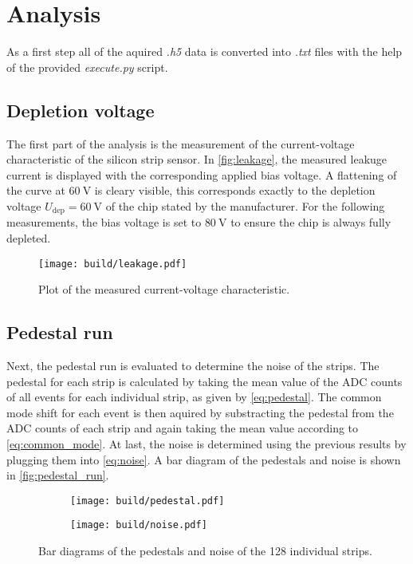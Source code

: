 \section{Analysis}
\label{sec:Analysis}

As a first step all of the aquired \textit{.h5} data is converted into \textit{.txt} files with
the help of the provided \textit{execute.py} script.

\subsection{Depletion voltage}

The first part of the analysis is the measurement of the current-voltage characteristic of the
silicon strip sensor. In \autoref{fig:leakage}, the measured leakuge current is displayed with
the corresponding applied bias voltage. A flattening of the curve at $\qty{60}{\volt}$ is cleary
visible, this corresponds exactly to the depletion voltage $U_{\text{dep}}=\qty{60}{\volt}$ of
the chip stated by the manufacturer. For the following measurements, the bias voltage is
set to $\qty{80}{\volt}$ to ensure the chip is always fully depleted.

\begin{figure}[H]
  \centering
  \texttt{[image: build/leakage.pdf]}
  \caption{Plot of the measured current-voltage characteristic.}
  \label{fig:leakage}
\end{figure}

\subsection{Pedestal run}

Next, the pedestal run is evaluated to determine the noise of the strips. The pedestal
for each strip is calculated by taking the mean value of the ADC counts of all events for each individual strip,
as given by \eqref{eq:pedestal}. The common mode shift for each event is then aquired by substracting
the pedestal from the ADC counts of each strip and again taking the mean value according to
\eqref{eq:common_mode}. At last, the noise is determined using the previous results by
plugging them into \eqref{eq:noise}. A bar diagram of the pedestals and noise is shown in
\autoref{fig:pedestal_run}.

\begin{figure}[H]
  \centering
    \begin{subfigure}{0.45\textwidth}
      \texttt{[image: build/pedestal.pdf]}
      \label{fig:pedestals}
    \end{subfigure}
    \begin{subfigure}{0.45\textwidth}
      \texttt{[image: build/noise.pdf]}
      \label{fig:noise}
    \end{subfigure} 
  \caption{Bar diagrams of the pedestals and noise of the 128 individual strips.}
  \label{fig:pedestal_run}
\end{figure}

